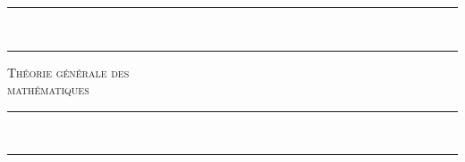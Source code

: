 \begin{titlepage}

\begin{center}
\pagecolor{cyan!30}

\vspace*{0.18\textheight}

\rule{0.8\linewidth}{0.7mm}\\[1.5ex]
\rule{\linewidth}{0.7mm}
\vspace{1cm}

{ \Huge \scshape Théorie générale des}\\[4ex]
{ \Huge \scshape mathématiques }
\vspace{1cm}

\rule{\linewidth}{0.7mm}\\[1.5ex]
\rule{0.8\linewidth}{0.7mm}

\vfill

\end{center}
\end{titlepage}
\clearpage
\restoregeometry
\pagecolor{white}